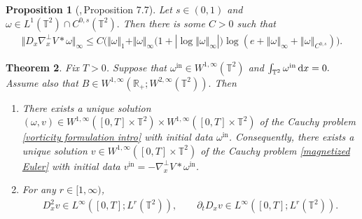 \documentclass[11pt,reqno]{amsart}
\newtheorem{thm}{Theorem}[section]
\newtheorem{prop}[thm]{Proposition}
\numberwithin{equation}{section}
\def\dd{{\rm d}}
\begin{document}
\begin{prop}[\cite{bahouri2011fourier},\,Proposition 7.7]\label{near boundedness}  
Let $s\in(0,1)$ and $\omega\in L^1(\mathbb T^2)\cap C^{0,s}(\mathbb T^2).$ 
Then there is some $C>0$ such that 
\begin{align*}
\big\Vert D_{x}\nabla_{x}^{\perp} V\ast \omega \big\Vert_{\infty}
\leq 
C\big(\Vert \omega\Vert_{1} 
+\Vert \omega\Vert_{\infty}(1+|\log\Vert \omega\Vert_{\infty}|\big)\log(e+\left\Vert \omega\right\Vert_{\infty}+\left\Vert \omega \right\Vert_{C^{0,s}})\big).
\end{align*} 
\end{prop}

\begin{thm}\label{Well posedness of EB}
Fix $T>0$. Suppose that $\omega^{\mathrm{in}}\in W^{1,\infty}(\mathbb{T}^{2})$ and
$\int_{\mathbb T^2}\omega^{\mathrm{in}}\,\dd x=0.$
Assume also that
$
B\in W^{1,\infty}(\mathbb{R}_{+};W^{2,\infty}(\mathbb{T}^{2})).
$
Then
\begin{enumerate}
   \item[{\rm(i)}]There exists a unique solution $(\omega,v)\in W^{1,\infty}([0,T]\times \mathbb{T}^{2})\times W^{1,\infty}([0,T]\times \mathbb{T}^{2})$ of the Cauchy problem \eqref{vorticity formulation intro} with initial data $\omega^{\mathrm{in}}$. 
Consequently, there exists a unique solution $v\in W^{1,\infty}([0,T]\times \mathbb{T}^{2})$ of 
the Cauchy problem \eqref{magnetized Euler} with initial data $v^{\mathrm{in}}=-\nabla_{x}^{\perp}V\ast \omega^{\mathrm{in}}$. 
 \item[{\rm(ii)}]For any $r\in [1,\infty)$,
 \begin{align}
D^{2}_{x}v\in L^{\infty}([0,T];L^{r}(\mathbb{T}^{2})), \qquad 
\partial_{t}D_{x}v\in L^{\infty}([0,T];L^{r}(\mathbb{T}^{2})). \label{useful est on vel}    
\end{align}
\end{enumerate}

\end{thm}
\end{document}
